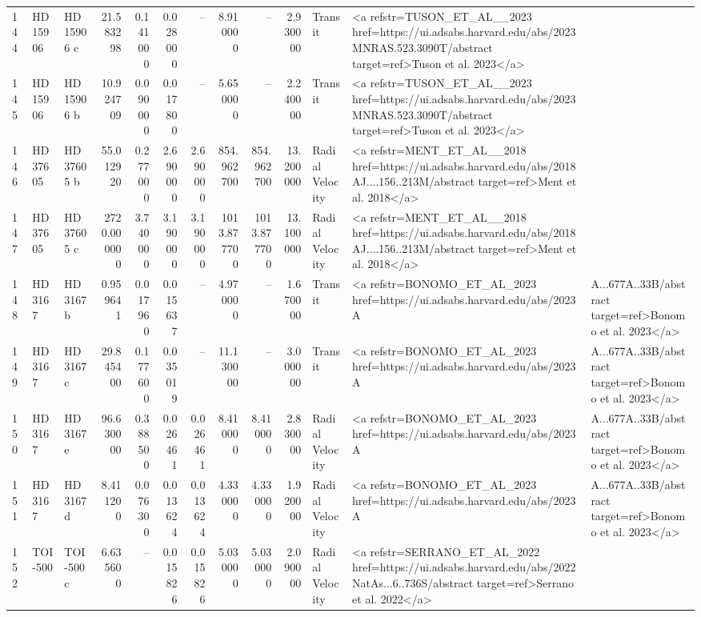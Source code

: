 \begin{tabular}{lllrrrrrrrll}
144 & HD 15906 & HD 15906 c & 21.583298 & 0.141000 & 0.028000 & -- & 8.910000 & -- & 2.930000 & Transit & <a refstr=TUSON_ET_AL__2023 href=https://ui.adsabs.harvard.edu/abs/2023MNRAS.523.3090T/abstract target=ref>Tuson et al. 2023</a> \\
145 & HD 15906 & HD 15906 b & 10.924709 & 0.090000 & 0.017800 & -- & 5.650000 & -- & 2.240000 & Transit & <a refstr=TUSON_ET_AL__2023 href=https://ui.adsabs.harvard.edu/abs/2023MNRAS.523.3090T/abstract target=ref>Tuson et al. 2023</a> \\
146 & HD 37605 & HD 37605 b & 55.012920 & 0.277000 & 2.690000 & 2.690000 & 854.962700 & 854.962700 & 13.200000 & Radial Velocity & <a refstr=MENT_ET_AL__2018 href=https://ui.adsabs.harvard.edu/abs/2018AJ....156..213M/abstract target=ref>Ment et al. 2018</a> \\
147 & HD 37605 & HD 37605 c & 2720.000000 & 3.740000 & 3.190000 & 3.190000 & 1013.877700 & 1013.877700 & 13.100000 & Radial Velocity & <a refstr=MENT_ET_AL__2018 href=https://ui.adsabs.harvard.edu/abs/2018AJ....156..213M/abstract target=ref>Ment et al. 2018</a> \\
148 & HD 3167 & HD 3167 b & 0.959641 & 0.017960 & 0.015637 & -- & 4.970000 & -- & 1.670000 & Transit & <a refstr=BONOMO_ET_AL_2023 href=https://ui.adsabs.harvard.edu/abs/2023A&A...677A..33B/abstract target=ref>Bonomo et al. 2023</a> \\
149 & HD 3167 & HD 3167 c & 29.845400 & 0.177600 & 0.035019 & -- & 11.130000 & -- & 3.000000 & Transit & <a refstr=BONOMO_ET_AL_2023 href=https://ui.adsabs.harvard.edu/abs/2023A&A...677A..33B/abstract target=ref>Bonomo et al. 2023</a> \\
150 & HD 3167 & HD 3167 e & 96.630000 & 0.388500 & 0.026461 & 0.026461 & 8.410000 & 8.410000 & 2.830000 & Radial Velocity & <a refstr=BONOMO_ET_AL_2023 href=https://ui.adsabs.harvard.edu/abs/2023A&A...677A..33B/abstract target=ref>Bonomo et al. 2023</a> \\
151 & HD 3167 & HD 3167 d & 8.411200 & 0.076300 & 0.013624 & 0.013624 & 4.330000 & 4.330000 & 1.920000 & Radial Velocity & <a refstr=BONOMO_ET_AL_2023 href=https://ui.adsabs.harvard.edu/abs/2023A&A...677A..33B/abstract target=ref>Bonomo et al. 2023</a> \\
152 & TOI-500 & TOI-500 c & 6.635600 & -- & 0.015826 & 0.015826 & 5.030000 & 5.030000 & 2.090000 & Radial Velocity & <a refstr=SERRANO_ET_AL_2022 href=https://ui.adsabs.harvard.edu/abs/2022NatAs...6..736S/abstract target=ref>Serrano et al. 2022</a> \\

\end{tabular}
